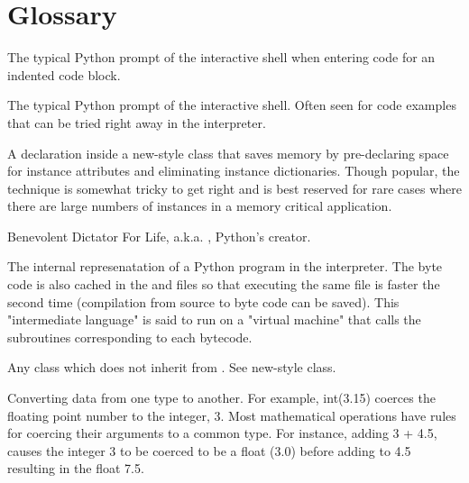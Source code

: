 \chapter{Glossary\label{glossary}}


\begin{description}

\item[...]{The typical Python prompt of the interactive shell when entering
code for an indented code block.}

\index{>>>}
\item[>>>]{The typical Python prompt of the interactive shell.  Often seen
for code examples that can be tried right away in the interpreter.}

\item[__slots__]{A declaration inside a new-style class that saves
memory by pre-declaring space for instance attributes and eliminating
instance dictionaries.  Though popular, the technique is somewhat tricky to
get right and is best reserved for rare cases where there are large numbers
of instances in a memory critical application.}

\item[BDFL]{Benevolent Dictator For Life, a.k.a. , Python's creator.}

\item[byte code]{The internal represenatation of a Python program in the
interpreter.  The byte code is also cached in the  and
{} files so that executing the same file is faster the second
time (compilation from source to byte code can be saved).  This
"intermediate language" is said to run on a "virtual machine" that calls the
subroutines corresponding to each bytecode.}

\item[classic class]{Any class which does not inherit from .
See new-style class.}

\item[coercion]{Converting data from one type to another.  For example,
int(3.15) coerces the floating point number to the integer, 3.  Most
mathematical operations have rules for coercing their arguments to a common
type.  For instance, adding 3 + 4.5, causes the integer 3 to be coerced to
be a float (3.0) before adding to 4.5 resulting in the float 7.5.}


\end{description}

